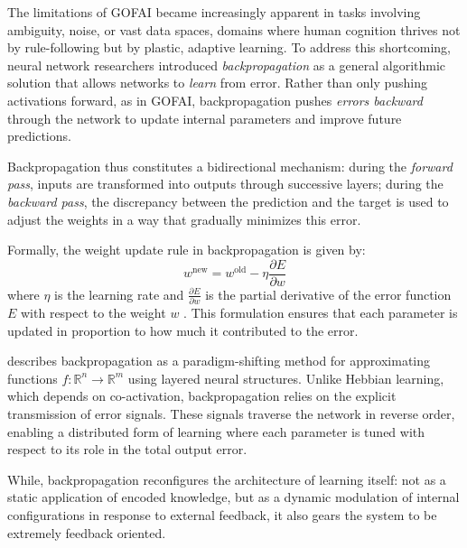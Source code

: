The limitations of GOFAI became increasingly apparent in tasks involving ambiguity, noise, or vast data spaces, domains where human cognition thrives not by rule-following but by plastic, adaptive learning. To address this shortcoming, neural network researchers introduced \textit{backpropagation} as a general algorithmic solution that allows networks to \emph{learn} from error. Rather than only pushing activations forward, as in GOFAI, backpropagation pushes \emph{errors backward} through the network to update internal parameters and improve future predictions.

Backpropagation thus constitutes a bidirectional mechanism: during the \textit{forward pass}, inputs are transformed into outputs through successive layers; during the \textit{backward pass}, the discrepancy between the prediction and the target is used to adjust the weights in a way that gradually minimizes this error.

Formally, the weight update rule in backpropagation is given by:
\[
	w^{\text{new}} = w^{\text{old}} - \eta \frac{\partial E}{\partial w}
\]
where \( \eta \) is the learning rate and \( \frac{\partial E}{\partial w} \) is the partial derivative of the error function \( E \) with respect to the weight \( w \) \parencite{hecht-nielsen1992}. This formulation ensures that each parameter is updated in proportion to how much it contributed to the error.

\textcite{hecht-nielsen1992} describes backpropagation as a paradigm-shifting method for approximating functions \( f: \mathbb{R}^n \to \mathbb{R}^m \) using layered neural structures. Unlike Hebbian learning, which depends on co-activation, backpropagation relies on the explicit transmission of error signals. These signals traverse the network in reverse order, enabling a distributed form of learning where each parameter is tuned with respect to its role in the total output error.

While, backpropagation reconfigures the architecture of learning itself: not as a static application of encoded knowledge, but as a dynamic modulation of internal configurations in response to external feedback, it also gears the system to be extremely feedback oriented.


